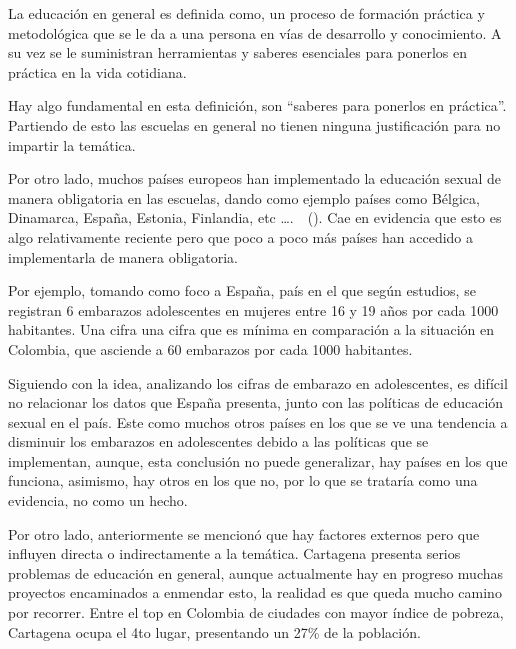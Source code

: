 \documentclass[letterpaper, 12pt]{article}
\begin{document}

La educación en general es definida como, un proceso de
formación práctica y metodológica que se le da a una
persona en vías de desarrollo y conocimiento. A su vez se
le suministran herramientas y saberes esenciales para
ponerlos en práctica en la vida
cotidiana.~\nocite{sánchez_2022}

Hay algo fundamental en esta definición, son ``saberes para
ponerlos en práctica''. Partiendo de esto las escuelas en
general no tienen ninguna justificación para no impartir la
temática.

Por otro lado, muchos países europeos han implementado la
educación sexual de manera obligatoria en las escuelas,
dando como ejemplo países como Bélgica, Dinamarca, España,
Estonia, Finlandia, etc
\dots.~\nocite{FundacionSexpol}~(\cite{PhotoPaísesEuropa}).
Cae en evidencia que esto es algo relativamente reciente
pero que poco a poco más países han accedido a
implementarla de manera obligatoria.

\nocite{bancoMundial}

Por ejemplo, tomando como foco a España, país en el que
según estudios, se registran 6 embarazos adolescentes en
mujeres entre 16 y 19 años por cada 1000 habitantes. Una
cifra una cifra que es mínima en comparación a la situación
en Colombia, que asciende a 60 embarazos por cada 1000
habitantes.

Siguiendo con la idea, analizando los cifras de embarazo en
adolescentes, es difícil no relacionar los datos que España
presenta, junto con las políticas de educación sexual en el
país. Este como muchos otros países en los que se ve una
tendencia a disminuir los embarazos en adolescentes debido
a las políticas que se implementan, aunque, esta conclusión
no puede generalizar, hay países en los que funciona,
asimismo, hay otros en los que no, por lo que se trataría
como una evidencia, no como un hecho.


\nocite{MinEducacion}
\nocite{CartagenaComoVamos__1}
\nocite{CifrasCartagena}

Por otro lado, anteriormente se mencionó que hay factores
externos pero que influyen directa o indirectamente a la
temática. Cartagena presenta serios problemas de educación
en general, aunque actualmente hay en progreso muchas
proyectos encaminados a enmendar esto, la realidad es que
queda mucho camino por recorrer. Entre el top en Colombia
de ciudades con mayor índice de pobreza, Cartagena ocupa el
4to lugar, presentando un 27\% de la población.
\end{document}
